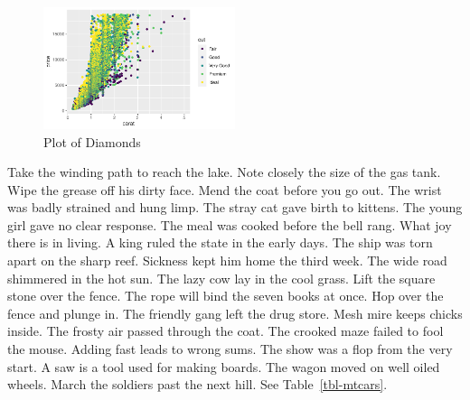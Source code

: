 \documentclass[
  letterpaper,
  DIV=11,
  numbers=noendperiod]{scrartcl}
\begin{document}
\begin{figure}

{\centering \includegraphics[width=0.5\textwidth,height=\textheight]{man_files/figure-pdf/fig-diamonds-1.pdf}

}

\caption{\label{fig-diamonds}Plot of Diamonds}

\end{figure}

Take the winding path to reach the lake. Note closely the size of the
gas tank. Wipe the grease off his dirty face. Mend the coat before you
go out. The wrist was badly strained and hung limp. The stray cat gave
birth to kittens. The young girl gave no clear response. The meal was
cooked before the bell rang. What joy there is in living. A king ruled
the state in the early days. The ship was torn apart on the sharp reef.
Sickness kept him home the third week. The wide road shimmered in the
hot sun. The lazy cow lay in the cool grass. Lift the square stone over
the fence. The rope will bind the seven books at once. Hop over the
fence and plunge in. The friendly gang left the drug store. Mesh mire
keeps chicks inside. The frosty air passed through the coat. The crooked
maze failed to fool the mouse. Adding fast leads to wrong sums. The show
was a flop from the very start. A saw is a tool used for making boards.
The wagon moved on well oiled wheels. March the soldiers past the next
hill. See Table~\ref{tbl-mtcars}.
\end{document}
